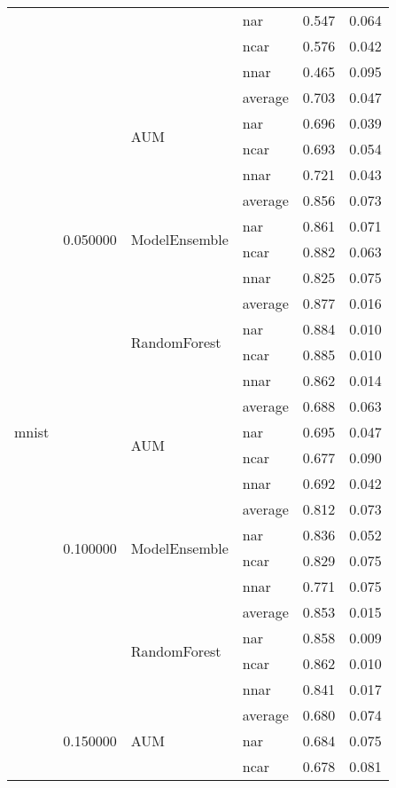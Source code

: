 \begin{longtable}{llllrr}
 &  &  & nar & 0.547 & 0.064 \\
 &  &  & ncar & 0.576 & 0.042 \\
 &  &  & nnar & 0.465 & 0.095 \\
\cline{1-6} \cline{2-6} \cline{3-6}
\multirow[t]{120}{*}{mnist} & \multirow[t]{12}{*}{0.050000} & \multirow[t]{4}{*}{AUM} & average & 0.703 & 0.047 \\
 &  &  & nar & 0.696 & 0.039 \\
 &  &  & ncar & 0.693 & 0.054 \\
 &  &  & nnar & 0.721 & 0.043 \\
\cline{3-6}
 &  & \multirow[t]{4}{*}{ModelEnsemble} & average & 0.856 & 0.073 \\
 &  &  & nar & 0.861 & 0.071 \\
 &  &  & ncar & 0.882 & 0.063 \\
 &  &  & nnar & 0.825 & 0.075 \\
\cline{3-6}
 &  & \multirow[t]{4}{*}{RandomForest} & average & 0.877 & 0.016 \\
 &  &  & nar & 0.884 & 0.010 \\
 &  &  & ncar & 0.885 & 0.010 \\
 &  &  & nnar & 0.862 & 0.014 \\
\cline{2-6} \cline{3-6}
 & \multirow[t]{12}{*}{0.100000} & \multirow[t]{4}{*}{AUM} & average & 0.688 & 0.063 \\
 &  &  & nar & 0.695 & 0.047 \\
 &  &  & ncar & 0.677 & 0.090 \\
 &  &  & nnar & 0.692 & 0.042 \\
\cline{3-6}
 &  & \multirow[t]{4}{*}{ModelEnsemble} & average & 0.812 & 0.073 \\
 &  &  & nar & 0.836 & 0.052 \\
 &  &  & ncar & 0.829 & 0.075 \\
 &  &  & nnar & 0.771 & 0.075 \\
\cline{3-6}
 &  & \multirow[t]{4}{*}{RandomForest} & average & 0.853 & 0.015 \\
 &  &  & nar & 0.858 & 0.009 \\
 &  &  & ncar & 0.862 & 0.010 \\
 &  &  & nnar & 0.841 & 0.017 \\
\cline{2-6} \cline{3-6}
 & \multirow[t]{12}{*}{0.150000} & \multirow[t]{4}{*}{AUM} & average & 0.680 & 0.074 \\
 &  &  & nar & 0.684 & 0.075 \\
 &  &  & ncar & 0.678 & 0.081 \\

\end{longtable}
